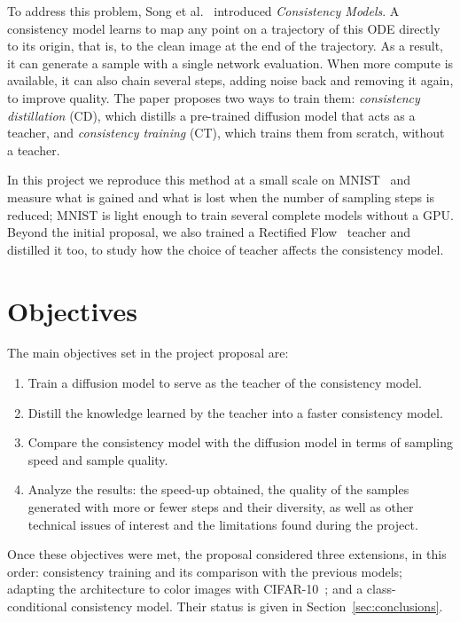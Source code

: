 \documentclass{article}
\begin{document}
To address this problem, Song et al.~\cite{song2023consistency} introduced
\emph{Consistency Models}. A consistency model learns to map any point on a
trajectory of this ODE directly to its origin, that is, to the clean image at
the end of the trajectory. As a result, it can generate a sample with a
single network evaluation. When more compute is available, it can also chain
several steps, adding noise back and removing it again, to improve quality.
The paper proposes two ways to train them: \emph{consistency distillation}
(CD), which distills a pre-trained diffusion model that acts as a teacher, and
\emph{consistency training} (CT), which trains them from scratch, without a
teacher.

In this project we reproduce this method at a small scale on
MNIST~\cite{lecun1998mnist} and measure what is gained and what is lost when
the number of sampling steps is reduced; MNIST is light enough to train
several complete models without a GPU. Beyond the initial proposal, we also
trained a Rectified Flow~\cite{liu2023flow} teacher and distilled it too, to
study how the choice of teacher affects the consistency model.

\section{Objectives}
\label{sec:objectives}

The main objectives set in the project proposal are:
\begin{enumerate}
  \item Train a diffusion model to serve as the teacher of the consistency
        model.
  \item Distill the knowledge learned by the teacher into a faster
        consistency model.
  \item Compare the consistency model with the diffusion model in terms of
        sampling speed and sample quality.
  \item Analyze the results: the speed-up obtained, the quality of the
        samples generated with more or fewer steps and their diversity, as
        well as other technical issues of interest and the limitations
        found during the project.
\end{enumerate}
Once these objectives were met, the proposal considered three extensions, in
this order: consistency training and its comparison with the previous models;
adapting the architecture to color images with
CIFAR-10~\cite{krizhevsky2009cifar}; and a class-conditional consistency
model. Their status is given in Section~\ref{sec:conclusions}.
\end{document}
